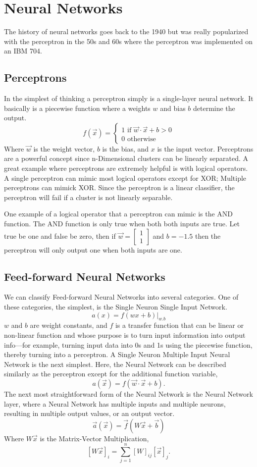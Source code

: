 \section{Neural Networks}

The history of neural networks goes back to the 1940 but was really popularized with the perceptron in the 50s and 60s where the perceptron was implemented on an IBM 704.

\subsection{Perceptrons}

In the simplest of thinking a perceptron simply is a single-layer neural network. It basically is a piecewise function where a weights $w$ and bias $b$ determine the output. $$f(\vec{x})=\begin{cases}
1 \mbox{ if } \vec{w}\cdot \vec{x}+b>0 \\
0 \mbox{ otherwise }
\end{cases}$$ Where $\vec{w}$  is the weight vector, $b$ is the bias, and $x$ is the input vector.  Perceptrons are a powerful concept since n-Dimensional clusters can be linearly separated. A great example where perceptrons are extremely helpful is with logical operators. A single perceptron can mimic most logical operators except for XOR; Multiple perceptrons can mimick XOR. Since the perceptron is a linear classifier, the perceptron will fail if a cluster is not linearly separable. 

One example of a logical operator that a perceptron can mimic is the AND function. The AND function is only true when both both inputs are true. Let true be one and false be zero, then if $\vec{w}=\begin{bmatrix}1 \\ 1\end{bmatrix}$ and $b=-1.5$ then the perceptron will only output one when both inputs are one.

\subsection{Feed-forward Neural Networks}

We can classify Feed-forward Neural Networks into several categories. One of these categories, the simplest, is the Single Neuron Single Input Network. 
$$a(x)=f(wx + b)|_{w.b}$$
$w$ and $b$ are weight constants, and $f$ is a transfer function that can be linear or non-linear function and whose purpose is to turn input information into output info—for example, turning input data into 0s and 1s using the piecewise function, thereby turning into a perceptron. A Single Neuron Multiple Input Neural Network is the next simplest. Here, the Neural Network can be described similarly as the perceptron except for the additional function variable, $$a(\vec{x})=f(\vec{w}\cdot \vec{x}+b).$$ The next most straightforward form of the Neural Network is the Neural Network layer, where a Neural Network has multiple inputs and multiple neurons, resulting in multiple output values, or an output vector. 
$$\vec{a}(\vec{x})=\vec{f}(W\vec{x}+\vec{b})$$ Where $W\vec{x}$ is the Matrix-Vector Multiplication, $$[W\vec{x}]_i=\sum_{j=1}^n [W]_{ij}[\vec{x}]_{j}.$$ 

